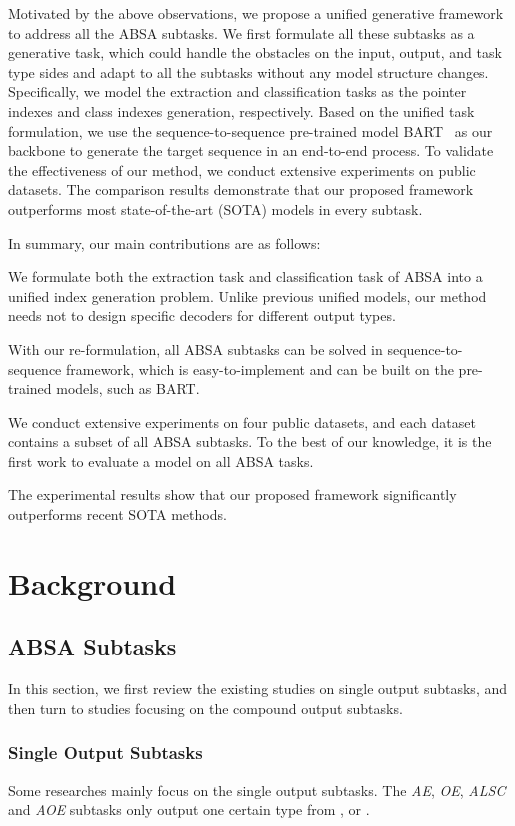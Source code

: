 \documentclass[11pt,a4paper]{article}
\begin{document}
Motivated by the above observations, we propose a unified generative framework to address all the ABSA subtasks. We first formulate all these subtasks as a  generative task, which could handle the obstacles on the input, output, and task type sides and adapt to all the subtasks without any model structure changes. Specifically, we model the extraction and classification tasks as the pointer indexes and class indexes generation, respectively.
Based on the unified task formulation, we use the sequence-to-sequence pre-trained model BART~\citep{DBLP:conf/acl/LewisLGGMLSZ20} as our backbone to generate the target sequence in an end-to-end process.  To validate the effectiveness of our method, we conduct extensive experiments on public datasets. The comparison results demonstrate that our proposed framework outperforms most state-of-the-art (SOTA) models in every subtask.

In summary, our main contributions are as follows:

 We formulate both the extraction task and classification task of ABSA into a unified index generation problem. Unlike previous unified models, our method needs not to design specific decoders for different output types.

 With our re-formulation, all ABSA subtasks can be solved in sequence-to-sequence framework, which is easy-to-implement and can be built on the pre-trained models, such as BART.

 We conduct extensive experiments on  four public datasets, and each dataset contains a subset of all ABSA subtasks. To the best of our knowledge, it is the first work to evaluate a model on all ABSA tasks.

 
The experimental results show that our proposed framework significantly outperforms recent SOTA methods.





\section{Background}
\subsection{ABSA Subtasks}
In this section, we first review the existing studies on single output subtasks, and then turn to studies focusing on the compound output subtasks.

\subsubsection{Single Output Subtasks}
Some researches mainly focus on the single output subtasks. The \emph{AE}, \emph{OE}, \emph{ALSC} and \emph{AOE} subtasks only output one certain type from ,  or .
\end{document}
